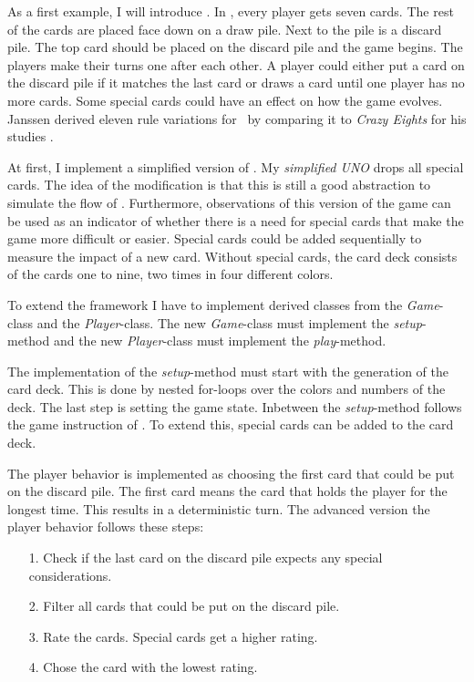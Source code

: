 As a first example, I will introduce \uno. In \uno, every player gets seven cards. The rest of the cards are placed face down on a draw pile. Next to the pile is a discard pile. The top card should be placed on the discard pile and the game begins. The players make their turns one after each other. A player could either put a card on the discard pile if it matches the last card or draws a card until one player has no more cards. Some special cards could have an effect on how the game evolves. Janssen derived eleven rule variations for \uno\ by comparing it to \textit{Crazy Eights} for his studies \cite{janssen2010evolution}.

At first, I implement a simplified version of \uno. My \textit{simplified UNO}  drops all special cards. The idea of the modification is that this is still a good abstraction to simulate the flow of \uno. Furthermore, observations of this version of the game can be used as an indicator of whether there is a need for special cards that make the game more difficult or easier. Special cards could be added sequentially to measure the impact of a new card. Without special cards, the card deck consists of the cards one to nine, two times in four different colors.

To extend the framework I have to implement derived classes from the \textit{Game}-class and the \textit{Player}-class. The new \textit{Game}-class must implement the \textit{setup}-method and the new \textit{Player}-class must implement the \textit{play}-method.

The implementation of the \textit{setup}-method must start with the generation of the card deck. This is done by nested for-loops over the colors and numbers of the deck. The last step is setting the game state. Inbetween the \textit{setup}-method follows the game instruction of \uno. To extend this, special cards can be added to the card deck.

The player behavior is implemented as choosing the first card that could be put on the discard pile. The first card means the card that holds the player for the longest time. This results in a deterministic turn. 
\newpage
The advanced version the player behavior follows these steps:

\begin{itemize}
\item[1.] Check if the last card on the discard pile expects any special considerations.
\item[2.] Filter all cards that could be put on the discard pile.
\item[3.] Rate the cards. Special cards get a higher rating.
\item[4.] Chose the card with the lowest rating.
\end{itemize}

